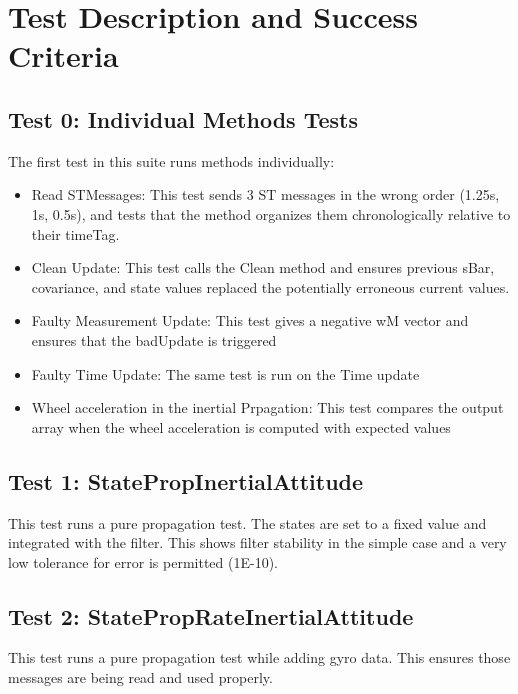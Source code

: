 
\newpage

\section{Test Description and Success Criteria}

\subsection{Test 0: Individual Methods Tests}

The first test in this suite runs methods individually:

\begin{itemize}
\item{Read STMessages:} This test sends 3 ST messages in the wrong order (1.25s, 1s, 0.5s), and tests that the method organizes them chronologically relative to their timeTag. 
\item{Clean Update:} This test calls the Clean method and ensures previous sBar, covariance, and state values replaced the potentially erroneous current values. 
\item{Faulty Measurement Update:} This test gives a negative wM vector and ensures that the badUpdate is triggered
\item{Faulty Time Update:} The same test is run on the Time update
\item{Wheel acceleration in the inertial Prpagation:} This test compares the output array when the wheel acceleration is computed with expected values
\end{itemize}

\subsection{Test 1: StatePropInertialAttitude}

This test runs a pure propagation test. The states are set to a fixed value and integrated with the filter.
This shows filter stability in the simple case and a very low tolerance for error is permitted (1E-10). 

\subsection{Test 2: StatePropRateInertialAttitude}

This test runs a pure propagation test while adding gyro data. This ensures those messages are being read and used properly. 

